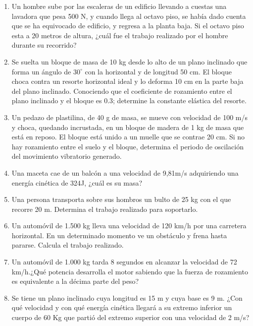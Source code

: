 \begin{enumerate}

\item Un hombre sube por las escaleras de un edificio llevando a cuestas una lavadora que pesa 500 N, y cuando llega al octavo 
piso, se había dado cuenta que se ha equivocado de edificio, y regresa a la planta baja. Si el octavo piso esta a 20 metros de 
altura, ¿cuál fue el trabajo realizado por el hombre durante su recorrido?

\item Se suelta un bloque de masa de 10 kg desde lo alto de un plano inclinado que forma un ángulo de $30^\circ$ con la
horizontal y de longitud 50 cm. El bloque choca contra un resorte horizontal ideal y lo deforma 10 cm en la parte baja del plano 
inclinado. Conociendo que el coeficiente de rozamiento entre el plano inclinado y el bloque es 0.3; determine la constante 
elástica del resorte.

\item Un pedazo de plastilina, de 40 g de masa, se mueve con velocidad de 100 m/s y choca, quedando incrustada, en un bloque de 
madera de 1 kg de masa que está en reposo. El bloque está unido a un muelle que se contrae 20 cm. Si no hay rozamiento entre 
el suelo y el bloque, determina el periodo de oscilación del movimiento vibratorio generado.

\item Una maceta cae de un balcón a una velocidad de 9,81m/s adquiriendo una energía cinética de 324J, ¿cuál es su masa?  

\item Una persona transporta sobre sus hombros un bulto de 25 kg con el que recorre 20 m. Determina el trabajo realizado para 
soportarlo. 

\item Un automóvil de 1.500 kg lleva una velocidad de 120 km/h por una carretera horizontal. En un determinado momento ve un 
obstáculo y frena hasta pararse. Calcula el trabajo realizado.

\item Un automóvil de 1.000 kg tarda 8 segundos en alcanzar la velocidad de 72 km/h.¿Qué potencia desarrolla el motor sabiendo 
que 
la fuerza de rozamiento es equivalente a la décima parte del peso? 

\item Se tiene un plano inclinado cuya longitud es 15 m y cuya base es 9 m. ¿Con qué velocidad y con qué energía cinética  
llegará 
a su extremo inferior un cuerpo de 60 Kg que partió del extremo superior con una velocidad de 2 m/s? 


\end{enumerate}
